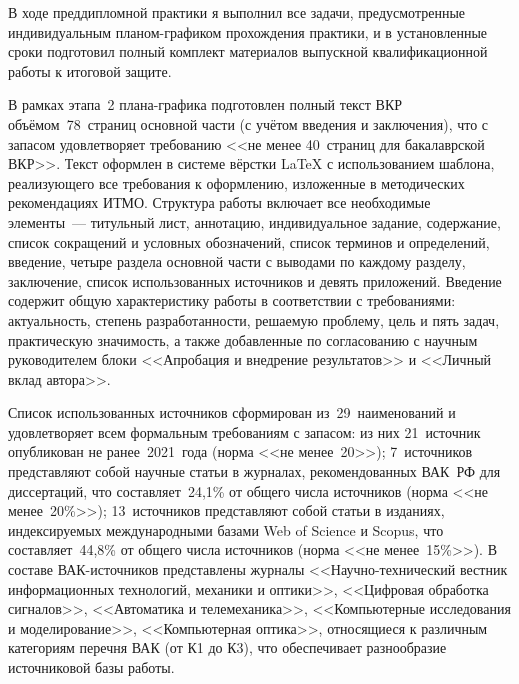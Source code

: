 
В ходе преддипломной практики я выполнил все задачи,
предусмотренные индивидуальным планом-графиком прохождения
практики, и в установленные сроки подготовил полный комплект
материалов выпускной квалификационной работы к итоговой защите.

В рамках этапа~2 плана-графика подготовлен полный текст ВКР
объёмом~78~страниц основной части (с учётом введения и
заключения), что с запасом удовлетворяет требованию <<не менее
40~страниц для бакалаврской ВКР>>. Текст оформлен в системе
вёрстки \LaTeX{} с использованием шаблона, реализующего все
требования к оформлению, изложенные в методических
рекомендациях ИТМО. Структура работы включает все необходимые
элементы~--- титульный лист, аннотацию, индивидуальное задание,
содержание, список сокращений и условных обозначений, список
терминов и определений, введение, четыре раздела основной части
с выводами по каждому разделу, заключение, список использованных
источников и девять приложений. Введение содержит общую
характеристику работы в соответствии с требованиями:
актуальность, степень разработанности, решаемую проблему, цель и
пять задач, практическую значимость, а также добавленные по
согласованию с научным руководителем блоки <<Апробация и
внедрение результатов>> и <<Личный вклад автора>>.

Список использованных источников сформирован из~29~наименований
и удовлетворяет всем формальным требованиям с запасом: из них
21~источник опубликован не ранее~2021~года (норма <<не
менее~20>>); 7~источников представляют собой научные статьи в
журналах, рекомендованных ВАК~РФ для диссертаций, что
составляет~24,1\% от общего числа источников (норма <<не
менее~20\%>>); 13~источников представляют собой статьи в
изданиях, индексируемых международными базами Web of Science
и Scopus, что составляет~44,8\% от общего числа источников
(норма <<не менее~15\%>>). В составе ВАК-источников
представлены журналы <<Научно-технический вестник
информационных технологий, механики и оптики>>, <<Цифровая
обработка сигналов>>, <<Автоматика и телемеханика>>,
<<Компьютерные исследования и моделирование>>, <<Компьютерная
оптика>>, относящиеся к различным категориям перечня ВАК (от
К1 до К3), что обеспечивает разнообразие источниковой базы
работы.


